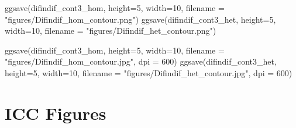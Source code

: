 \documentclass[
]{article}
\newenvironment{Shaded}{\begin{snugshade}}{\end{snugshade}}
\newcommand{\AttributeTok}[1]{\textcolor[rgb]{0.77,0.63,0.00}{#1}}
\newcommand{\DecValTok}[1]{\textcolor[rgb]{0.00,0.00,0.81}{#1}}
\newcommand{\FunctionTok}[1]{\textcolor[rgb]{0.00,0.00,0.00}{#1}}
\newcommand{\NormalTok}[1]{#1}
\newcommand{\StringTok}[1]{\textcolor[rgb]{0.31,0.60,0.02}{#1}}
\begin{document}
\begin{Shaded}
\begin{Highlighting}[]
\FunctionTok{ggsave}\NormalTok{(difindif\_cont3\_hom, }\AttributeTok{height=}\DecValTok{5}\NormalTok{, }\AttributeTok{width=}\DecValTok{10}\NormalTok{, }\AttributeTok{filename =} \StringTok{"figures/Difindif\_hom\_contour.png"}\NormalTok{)}
\FunctionTok{ggsave}\NormalTok{(difindif\_cont3\_het, }\AttributeTok{height=}\DecValTok{5}\NormalTok{, }\AttributeTok{width=}\DecValTok{10}\NormalTok{, }\AttributeTok{filename =} \StringTok{"figures/Difindif\_het\_contour.png"}\NormalTok{)}

\FunctionTok{ggsave}\NormalTok{(difindif\_cont3\_hom, }\AttributeTok{height=}\DecValTok{5}\NormalTok{, }\AttributeTok{width=}\DecValTok{10}\NormalTok{, }\AttributeTok{filename =} \StringTok{"figures/Difindif\_hom\_contour.jpg"}\NormalTok{, }
       \AttributeTok{dpi =} \DecValTok{600}\NormalTok{)}
\FunctionTok{ggsave}\NormalTok{(difindif\_cont3\_het, }\AttributeTok{height=}\DecValTok{5}\NormalTok{, }\AttributeTok{width=}\DecValTok{10}\NormalTok{, }\AttributeTok{filename =} \StringTok{"figures/Difindif\_het\_contour.jpg"}\NormalTok{, }
       \AttributeTok{dpi =} \DecValTok{600}\NormalTok{)}
\end{Highlighting}
\end{Shaded}

\hypertarget{icc-figures}{%
\section{ICC Figures}\label{icc-figures}}
\end{document}

